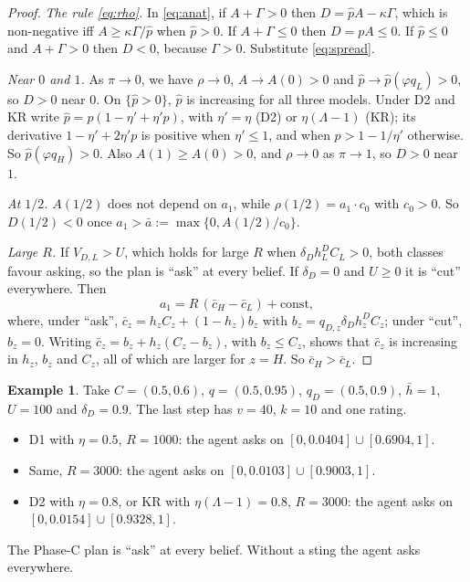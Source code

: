 \documentclass[11pt,a4paper]{article}
\theoremstyle{definition}
\newtheorem{example}[theorem]{Example}
\theoremstyle{remark}
\newcommand{\pp}{\hat p}
\begin{document}
\begin{proof}
\emph{The rule \eqref{eq:rho}.} In \eqref{eq:anat}, if $A+\Gamma>0$ then $D=\pp A-\kappa\Gamma$, which is non-negative iff $A\ge\kappa\Gamma/\pp$ when $\pp>0$. If $A+\Gamma\le0$ then $D=pA\le0$. If $\pp\le0$ and $A+\Gamma>0$ then $D<0$, because $\Gamma>0$. Substitute \eqref{eq:spread}.

\emph{Near $0$ and $1$.} As $\pi\to0$, we have $\rho\to0$, $A\to A(0)>0$ and $\pp\to\pp(\varphi q_L)>0$, so $D>0$ near $0$. On $\{\pp>0\}$, $\pp$ is increasing for all three models. Under D2 and KR write $\pp=p(1-\eta'+\eta'p)$, with $\eta'=\eta$ (D2) or $\eta(\Lambda-1)$ (KR); its derivative $1-\eta'+2\eta'p$ is positive when $\eta'\le1$, and when $p>1-1/\eta'$ otherwise. So $\pp(\varphi q_H)>0$. Also $A(1)\ge A(0)>0$, and $\rho\to0$ as $\pi\to1$, so $D>0$ near $1$.

\emph{At $1/2$.} $A(1/2)$ does not depend on $a_1$, while $\rho(1/2)=a_1\cdot c_0$ with $c_0>0$. So $D(1/2)<0$ once $a_1>\bar a:=\max\{0,A(1/2)/c_0\}$.

\emph{Large $R$.} If $V_{D,L}>U$, which holds for large $R$ when $\delta_Dh^D_LC_L>0$, both classes favour asking, so the plan is ``ask'' at every belief. If $\delta_D=0$ and $U\ge0$ it is ``cut'' everywhere. Then
\[
a_1=R\,(\bar c_H-\bar c_L)+\text{const},
\]
where, under ``ask'', $\bar c_z=h_zC_z+(1-h_z)b_z$ with $b_z=q_{D,z}\delta_Dh^D_zC_z$; under ``cut'', $b_z=0$. Writing $\bar c_z=b_z+h_z(C_z-b_z)$, with $b_z\le C_z$, shows that $\bar c_z$ is increasing in $h_z$, $b_z$ and $C_z$, all of which are larger for $z=H$. So $\bar c_H>\bar c_L$.
\end{proof}

\begin{example}\label{ex:c1B}
Take $C=(0.5,0.6)$, $q=(0.5,0.95)$, $q_D=(0.5,0.9)$, $\bar h=1$, $U=100$ and $\delta_D=0.9$. The last step has $v=40$, $k=10$ and one rating.
\begin{itemize}[nosep]
\item D1 with $\eta=0.5$, $R=1000$: the agent asks on $[0,0.0404]\cup[0.6904,1]$.
\item Same, $R=3000$: the agent asks on $[0,0.0103]\cup[0.9003,1]$.
\item D2 with $\eta=0.8$, or KR with $\eta(\Lambda-1)=0.8$, $R=3000$: the agent asks on $[0,0.0154]\cup[0.9328,1]$.
\end{itemize}
The Phase-C plan is ``ask'' at every belief. Without a sting the agent asks everywhere.
\end{example}
\end{document}
